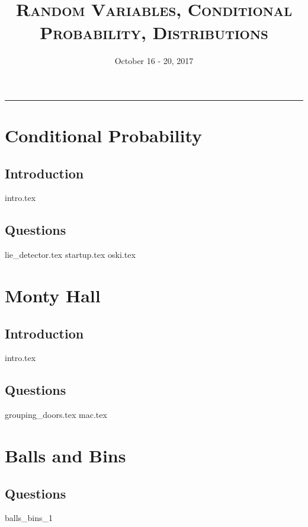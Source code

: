 \documentclass{exam}
\title{\textsc{Random Variables, Conditional Probability, Distributions}}
\date{October 16 - 20, 2017}
\begin{document}
\maketitle
\rule{\textwidth}{0.15em}
\fontsize{12}{15}\selectfont
\thispagestyle{empty}

\section{Conditional Probability}
\subsection{Introduction}
{intro.tex}
\subsection{Questions}
\begin{questions}
{lie_detector.tex}
{startup.tex}
{oski.tex}
\end{questions}

\section{Monty Hall}
\subsection{Introduction}
{intro.tex}
\subsection{Questions}
\begin{questions}
{grouping_doors.tex}
{mac.tex}
\end{questions}

\section{Balls and Bins}
\begin{questions}
\subsection{Questions}
{balls_bins_1}
\end{questions}
\end{document}
